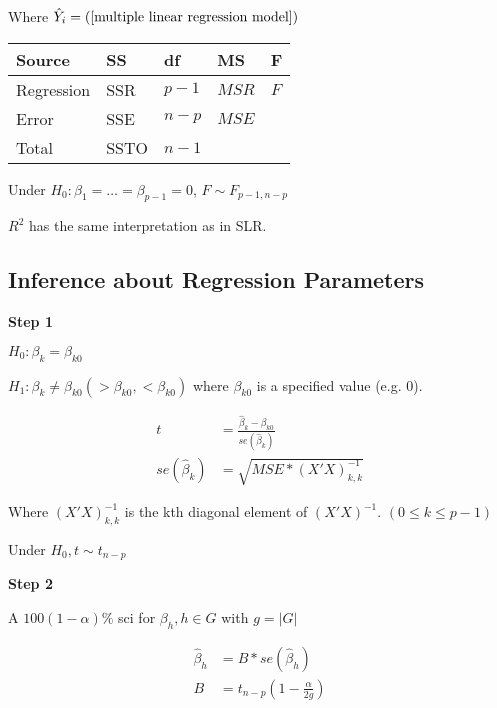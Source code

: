 \documentclass[10pt]{article}
\begin{document}
\begin{multicols}{3}
    Where $\hat Y_i = (\ref{multiple linear regression model})$

    \begin{center}
        \begin{tabular}{l l l l l}
            Source     & SS   & df      & MS    & F   \\ \hline
            Regression & SSR  & $p - 1$ & $MSR$ & $F$ \\
            Error      & SSE  & $n - p$ & $MSE$ &     \\
            Total      & SSTO & $n - 1$ &       &     \\
        \end{tabular}
    \end{center}

    Under $H_0: \beta_1 = \dots = \beta_{p - 1} = 0$, $F \sim F_{p - 1, n - p}$

    $R^2$ has the same interpretation as in SLR.

    \subsection{Inference about Regression Parameters}

    \textbf{Step 1}

    $H_0: \beta_k = \beta_{k0}$

    $H_1: \beta_k \ne \beta_{k0} (> \beta_{k0}, < \beta_{k0})$ where $\beta_{k0}$ is a specified value (e.g. 0).

    \begin{align}
        t               & = \frac{ \hat\beta_k - \beta_{k0} }{ se(\hat\beta_k) } \\
        se(\hat\beta_k) & = \sqrt{MSE * (X'X)^{-1}_{k,k}}
    \end{align}

    Where $(X'X)^{-1}_{k,k}$ is the kth diagonal element of $(X'X)^{-1}$.
    $(0 \leq k \leq p - 1)$

    Under $H_0, t \sim t_{n - p}$

    \textbf{Step 2}

    A $100(1 - \alpha)\%$ sci for $\beta_h, h \in G$ with $g = |G|$

    \begin{align}
        \hat\beta_h & = B * se(\hat\beta_h)                            \\
        B           & = t_{n - p} \left( 1 - \frac{\alpha}{2g} \right)
    \end{align}


\end{multicols}
\end{document}

